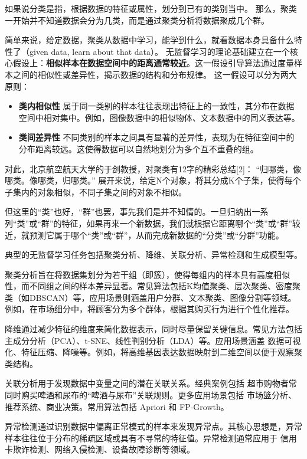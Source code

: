 如果说分类是指，根据数据的特征或属性，划分到已有的类别当中。
那么，聚类一开始并不知道数据会分为几类，而是通过聚类分析将数据聚成几个群。

简单来说，给定数据，聚类从数据中学习，能学到什么，就看数据本身具备什么特性了（given data, learn about that data）。
无监督学习的理论基础建立在一个核心假设上：{\bf 相似样本在数据空间中的距离通常较近}。这一假设引导算法通过度量样本之间的相似性或差异性，揭示数据的结构和分布规律。
这一假设可以分为两大原则：
\begin{itemize}
\item {\bf 类内相似性}  属于同一类别的样本往往表现出特征上的一致性，其分布在数据空间中相对集中。例如，图像数据中的相似物体、文本数据中的同义表达等。
\item {\bf 类间差异性}  不同类别的样本之间具有显著的差异性，表现为在特征空间中的分布距离较远。这使得数据可以自然地划分为多个互不重叠的组。
\end{itemize}

对此，北京航空航天大学的于剑教授，对聚类有12字的精彩总结[2]：
“归哪类，像哪类。像哪类，归哪类。”
展开来说，给定N个对象，将其分成K个子集，使得每个子集内的对象相似，不同子集之间的对象不相似。

但这里的“类”也好，“群”也罢，事先我们是并不知情的。一旦归纳出一系列“类”或“群”的特征，如果再来一个新数据，我们就根据它距离哪个“类”或“群”较近，就预测它属于哪个“类”或“群”，从而完成新数据的“分类”或“分群”功能。

典型的无监督学习任务包括聚类分析、降维、关联分析、异常检测和生成模型等。

聚类分析旨在将数据集划分为若干组（即簇），使得每组内的样本具有高度相似性，而不同组之间的样本差异显著。常见算法包括K均值聚类、层次聚类、密度聚类（如DBSCAN）等，应用场景则涵盖用户分群、文本聚类、图像分割等领域。例如，在市场细分中，将顾客分为多个群体，根据其购买行为进行个性化推荐。

降维通过减少特征的维度来简化数据表示，同时尽量保留关键信息。常见方法包括主成分分析（PCA）、t-SNE、线性判别分析（LDA）等。应用场景涵盖 数据可视化、特征压缩、降噪等。例如，将高维基因表达数据映射到二维空间以便于观察聚类结构。

关联分析用于发现数据中变量之间的潜在关联关系。经典案例包括 超市购物者常同时购买啤酒和尿布的“啤酒与尿布”关联规则。更多应用场景包括 市场篮分析、推荐系统、商业决策。常用算法包括 Apriori 和 FP-Growth。

异常检测通过识别数据中偏离正常模式的样本来发现异常点。其核心思想是，异常样本往往位于分布的稀疏区域或具有不寻常的特征值。异常检测通常应用于 信用卡欺诈检测、网络入侵检测、设备故障诊断等领域。

